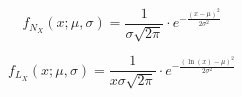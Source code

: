   
\begin{equation}
{\displaystyle f_{N_X}(x;\mu,\sigma) = \frac{1}{\sigma\sqrt{2\pi}}\cdot e^{-\frac{(x-\mu)^2}{2\sigma^2}}}
\label{equ:Normal}
\end{equation}

\begin{equation}
	{\displaystyle f_{L_X}(x;\mu ,\sigma )={\frac {1}{x\sigma {\sqrt {2\pi }}}}\cdot e^ {-\frac {\left(\ln(x)-\mu \right)^{2}}{2\sigma ^{2}}}}
	\label{eq:Lognormal}
\end{equation}




